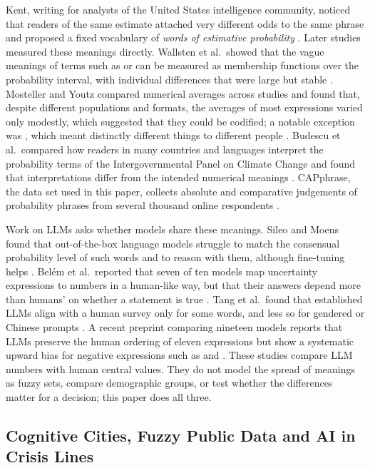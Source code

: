 Kent, writing for analysts of the United States intelligence community, noticed that readers of the same estimate
attached very different odds to the same phrase and proposed a fixed vocabulary of \emph{words of estimative
probability} \citep{kent1964words}.
Later studies measured these meanings directly.
Wallsten et al.\ showed that the vague meanings of terms such as  or  can be measured as
membership functions over the probability interval, with individual differences that were large but stable
\citep{wallsten1986measuring}.
Mosteller and Youtz compared numerical averages across studies and found that, despite different populations and
formats, the averages of most expressions varied only modestly, which suggested that they could be codified; a notable
exception was , which meant distinctly different things to different people \citep{mosteller1990quantifying}.
Budescu et al.\ compared how readers in many countries and languages interpret the probability terms of the
Intergovernmental Panel on Climate Change and found that interpretations differ from the intended numerical meanings
\citep{budescu2014ipcc}.
CAPphrase, the data set used in this paper, collects absolute and comparative judgements of \WoneNTerms{} probability
phrases from several thousand online respondents \citep{kucharski2026capphrase}.

Work on LLMs asks whether models share these meanings.
Sileo and Moens found that out-of-the-box language models struggle to match the consensual probability level of such
words and to reason with them, although fine-tuning helps \citep{sileo2023probing}.
Belém et al.\ reported that seven of ten models map uncertainty expressions to numbers in a human-like way, but that
their answers depend more than humans' on whether a statement is true \citep{belem2024perceptions}.
Tang et al.\ found that established LLMs align with a human survey only for some words, and less so for gendered or
Chinese prompts \citep{tang2026estimative}.
A recent preprint comparing nineteen models reports that LLMs preserve the human ordering of eleven expressions but
show a systematic upward bias for negative expressions such as  and 
\citep{petridis2026unlikely}.
These studies compare LLM numbers with human central values.
They do not model the spread of meanings as fuzzy sets, compare demographic groups, or test whether the differences
matter for a decision; this paper does all three.

\subsection{Cognitive Cities, Fuzzy Public Data and AI in Crisis Lines}
\label{sec:bg-cities}

